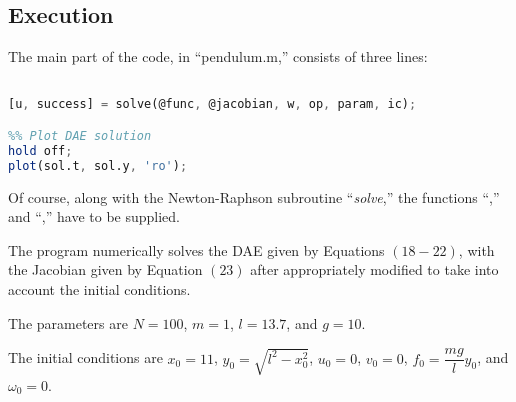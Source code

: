 \documentclass[11pt]{amsdtx}
\begin{document}
	
\subsection{Execution}


The main part of the code, in ``pendulum.m,'' consists of three lines:
\footnotesize{
\begin{lstlisting}[language=Octave, frame=single] 

[u, success] = solve(@func, @jacobian, w, op, param, ic);

%% Plot DAE solution
hold off;
plot(sol.t, sol.y, 'ro');

\end{lstlisting}
}
\normalsize{}
Of course, along with the Newton-Raphson subroutine ``\textit{solve},'' the functions ``\textit{},'' and ``\textit{},'' have to be supplied.


The program numerically solves the DAE given by Equations $(18 - 22)$, with the Jacobian given by Equation $(23)$ after appropriately modified to take into account the initial conditions.

The parameters are $N = 100$, $m = 1$, $l = 13.7$, and $g = 10$.

The initial conditions are $x_0 = 11$, $y_0 = \sqrt{l^2 - x_0^2}$, $u_0 = 0$, $v_0 = 0$, $f_0 = \dfrac{mg}{l}y_0$, and $\omega_0 = 0$.

\end{document}
